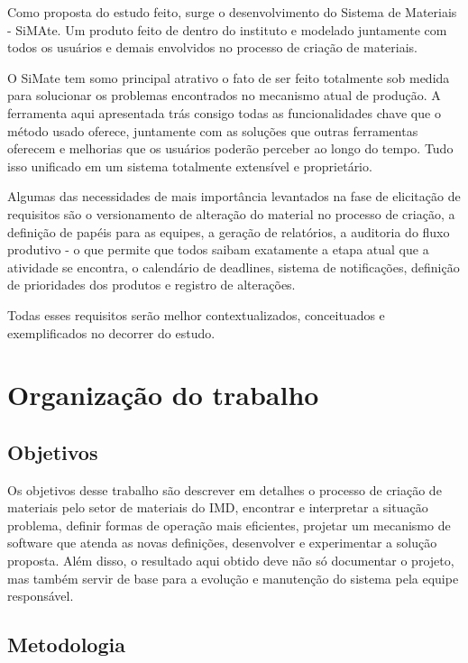 Como proposta do estudo feito, surge o desenvolvimento do Sistema de Materiais - SiMAte. Um produto feito de dentro do instituto e modelado juntamente com todos os usuários e demais envolvidos no processo de criação de materiais.

O SiMate tem somo principal atrativo o fato de ser feito totalmente sob medida para solucionar os problemas encontrados no mecanismo atual de produção. A ferramenta aqui apresentada trás consigo todas as funcionalidades chave que o método usado oferece, juntamente com as soluções que outras ferramentas oferecem e melhorias que os usuários poderão perceber ao longo do tempo. Tudo isso unificado em um sistema totalmente extensível e proprietário.

Algumas das necessidades de mais importância levantados na fase de elicitação de requisitos são o versionamento de alteração do material no processo de criação, a definição de papéis para as equipes, a geração de relatórios, a auditoria do fluxo produtivo - o que permite que todos saibam exatamente a etapa atual que a atividade se encontra, o calendário de deadlines, sistema de notificações, definição de prioridades dos produtos e registro de alterações.

Todas esses requisitos serão melhor contextualizados, conceituados e exemplificados no decorrer do estudo.

\section{Organização do trabalho}

\subsection{Objetivos}

Os objetivos desse trabalho são descrever em detalhes o processo de criação de materiais pelo setor de materiais do IMD, encontrar e interpretar a situação problema, definir formas de operação mais eficientes, projetar um mecanismo de software que atenda as novas definições, desenvolver e experimentar a solução proposta. Além disso, o resultado aqui obtido deve não só documentar o projeto, mas também servir de base para a evolução e manutenção do sistema pela equipe responsável.

\subsection{Metodologia}


